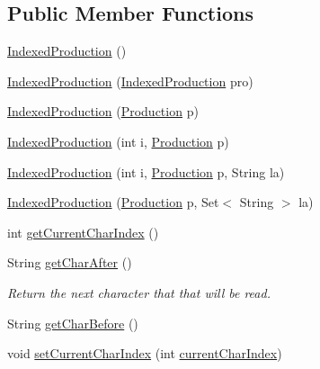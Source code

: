 \subsection*{Public Member Functions}
\begin{DoxyCompactItemize}
\item 
\hyperlink{classcontext_free_1_1parser_1_1_indexed_production_a976a2127d6e44c5dd064107c1ad75153}{Indexed\-Production} ()
\item 
\hyperlink{classcontext_free_1_1parser_1_1_indexed_production_a7c67c63baac69c30e9887c0234fd35d9}{Indexed\-Production} (\hyperlink{classcontext_free_1_1parser_1_1_indexed_production}{Indexed\-Production} pro)
\item 
\hyperlink{classcontext_free_1_1parser_1_1_indexed_production_a33ac7cade5d7f2a750e07f3b7f7983ac}{Indexed\-Production} (\hyperlink{classcontext_free_1_1grammar_1_1_production}{Production} p)
\item 
\hyperlink{classcontext_free_1_1parser_1_1_indexed_production_ac1615174ca96db64a5adfdabd768f9d5}{Indexed\-Production} (int i, \hyperlink{classcontext_free_1_1grammar_1_1_production}{Production} p)
\item 
\hyperlink{classcontext_free_1_1parser_1_1_indexed_production_aa1754311192ad2f5c0332025dd162e5f}{Indexed\-Production} (int i, \hyperlink{classcontext_free_1_1grammar_1_1_production}{Production} p, String la)
\item 
\hyperlink{classcontext_free_1_1parser_1_1_indexed_production_af2e1718023e522ef94aac862ab72307b}{Indexed\-Production} (\hyperlink{classcontext_free_1_1grammar_1_1_production}{Production} p, Set$<$ String $>$ la)
\item 
int \hyperlink{classcontext_free_1_1parser_1_1_indexed_production_aef48dbe23561cee5a0b744978d1ac2c7}{get\-Current\-Char\-Index} ()
\item 
String \hyperlink{classcontext_free_1_1parser_1_1_indexed_production_a498db47a05e7f10e580d689e925193b4}{get\-Char\-After} ()
\begin{DoxyCompactList}\small\item\em Return the next character that that will be read. \end{DoxyCompactList}\item 
String \hyperlink{classcontext_free_1_1parser_1_1_indexed_production_a143a99e7bf0e81789ee79f514aa3d575}{get\-Char\-Before} ()
\item 
void \hyperlink{classcontext_free_1_1parser_1_1_indexed_production_a9673f863b315e7cff584048585906718}{set\-Current\-Char\-Index} (int \hyperlink{classcontext_free_1_1parser_1_1_indexed_production_a8ed426b66a378ce272cc13ae397e52cd}{current\-Char\-Index})

\end{DoxyCompactItemize}
